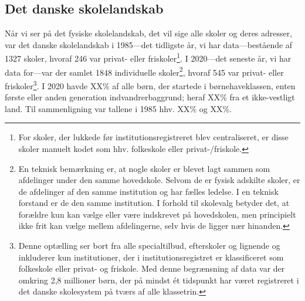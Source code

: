 \documentclass[
]{book}
\begin{document}
\hypertarget{det-danske-skolelandskab}{%
\subsection{Det danske skolelandskab}\label{det-danske-skolelandskab}}

Når vi ser på det fysiske skolelandskab, det vil sige alle skoler og deres adresser, var det danske skolelandskab i 1985---det tidligste år, vi har data---bestående af 1327 skoler, hvoraf 246 var privat- eller friskoler\footnote{For skoler, der lukkede før institutionsregistreret blev centraliseret, er disse skoler manuelt kodet som hhv. folkeskole eller privat-/friskole.}. I 2020---det seneste år, vi har data for---var der samlet 1848 individuelle skoler\footnote{En teknisk bemærkning er, at nogle skoler er blevet lagt sammen som afdelinger under den samme hovedskole. Selvom de er fysisk adskilte skoler, er de afdelinger af den samme institution og har fælles ledelse. I en teknisk forstand er de den samme institution. I forhold til skolevalg betyder det, at forældre kun kan vælge eller være indskrevet på hovedskolen, men principielt ikke frit kan vælge mellem afdelingerne, selv hvis de ligger nær hinanden.}, hvoraf 545 var privat- eller friskoler\footnote{Denne optælling ser bort fra alle specialtilbud, efterskoler og lignende og inkluderer kun institutioner, der i institutionsregistret er klassificeret som folkeskole eller privat- og friskole. Med denne begrænsning af data var der omkring 2,8 millioner børn, der på mindst ét tidspunkt har været registreret i det danske skolesystem på tværs af alle klassetrin.}. I 2020 havde XX\% af alle børn, der startede i børnehaveklassen, enten første eller anden generation indvandrerbaggrund; heraf XX\% fra et ikke-vestligt land. Til sammenligning var tallene i 1985 hhv. XX\% og XX\%.
\end{document}
